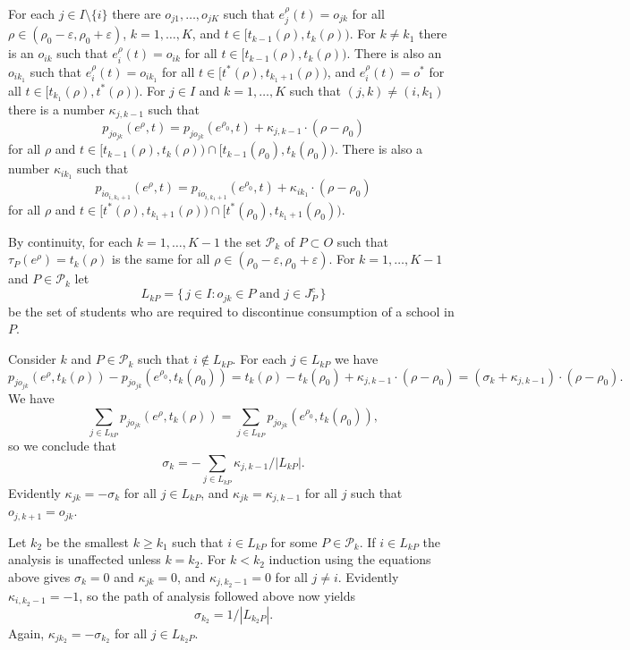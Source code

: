 \documentclass[12pt]{article}
\theoremstyle{definition}
\newcommand{\cP}{\mathcal{P}}
\newcommand{\varep}{\varepsilon}
\begin{document}
\begin{appendix}
For each $j \in I \setminus \{i\}$ there are $o_{j1}, \ldots, o_{jK}$ such that  $e_j^\rho(t) = o_{jk}$ for all $\rho \in (\rho_0 - \varep,\rho_0 + \varep)$, $k = 1, \ldots, K$, and $t \in [t_{k-1}(\rho),t_k(\rho))$.  For $k \ne k_1$ there is an $o_{ik}$ such that $e_i^\rho(t) = o_{ik}$ for all $t \in [t_{k-1}(\rho),t_k(\rho))$.  There is also an $o_{ik_1}$ such that $e_i^\rho(t) = o_{ik_1}$ for all $t \in [t^*(\rho),t_{k_1 + 1}(\rho))$, and $e_i^\rho(t) = o^*$ for all $t \in [t_{k_1}(\rho), t^*(\rho))$.  For $j \in I$ and $k = 1, \ldots, K$ such that $(j,k) \ne (i,k_1)$ there is a number $\kappa_{j,k-1}$ such that
$$p_{jo_{jk}}(e^\rho,t) = p_{jo_{jk}}(e^{\rho_0},t) + \kappa_{j,k-1} \cdot (\rho - \rho_0)$$
for all $\rho$ and $t \in [t_{k-1}(\rho),t_k(\rho)) \cap [t_{k-1}(\rho_0),t_k(\rho_0))$.  There is also a number $\kappa_{ik_1}$ such that
$$p_{io_{i,k_1+1}}(e^\rho,t) = p_{io_{i,k_1+1}}(e^{\rho_0},t) + \kappa_{ik_1} \cdot (\rho - \rho_0)$$
for all $\rho$ and $t \in [t^*(\rho),t_{k_1+1}(\rho)) \cap [t^*(\rho_0),t_{k_1+1}(\rho_0))$.

By continuity, for each $k = 1, \ldots, K-1$ the set $\cP_k$ of $P \subset O$ such that $\tau_P(e^\rho) = t_k(\rho)$ is the same for all $\rho \in (\rho_0 - \varep,\rho_0 + \varep)$. 
For $k = 1, \ldots, K-1$ and $P \in \cP_k$ let $$L_{kP} = \{\, j \in I : \text{$o_{jk} \in P$ and $j \in J_P^c$} \,\}$$
be the set of students who are required to discontinue consumption of a school in $P$.  

Consider $k$ and $P \in \cP_k$ such that $i \notin L_{kP}$.  For each $j \in L_{kP}$ we have
$$p_{jo_{jk}}(e^\rho,t_k(\rho)) - p_{jo_{jk}}(e^{\rho_0},t_k(\rho_0)) = t_k(\rho) - t_k(\rho_0) + \kappa_{j,k-1} \cdot (\rho - \rho_0) = (\sigma_k + \kappa_{j,k-1}) \cdot (\rho - \rho_0).$$
We have
$$\sum_{j \in L_{kP}} p_{jo_{jk}}(e^\rho,t_k(\rho)) = \sum_{j \in L_{kP}} p_{jo_{jk}}(e^{\rho_0},t_k(\rho_0)),$$  
so we conclude that
$$\sigma_k = -\sum_{j \in L_{kP}} \kappa_{j,k-1}/|L_{kP}|.$$
Evidently
$\kappa_{jk} = -\sigma_k$ for all $j \in L_{kP}$, and $\kappa_{jk} = \kappa_{j,k-1}$ for all $j$ such that $o_{j,k+1} = o_{jk}$.


Let $k_2$ be the smallest $k \ge k_1$ such that $i \in L_{kP}$ for some $P \in \cP_k$.  If $i \in L_{kP}$ the analysis is unaffected unless $k = k_2$.  For $k < k_2$ induction using the equations above gives $\sigma_k = 0$ and $\kappa_{jk} = 0$, and $\kappa_{j,k_2 - 1} = 0$ for all $j \ne i$.  Evidently $\kappa_{i,k_2 - 1} = -1$, so the path of analysis followed above now yields
$$\sigma_{k_2} = 1/|L_{k_2P}|.$$
Again,
$\kappa_{jk_2} = -\sigma_{k_2}$ for all $j \in L_{k_2P}$.


\end{appendix}
\end{document}
